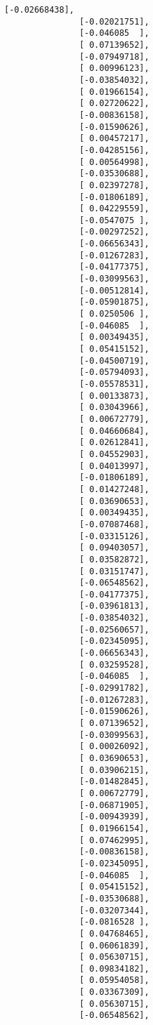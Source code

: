 \documentclass[11pt]{article}
\begin{document}
\begin{Verbatim}[commandchars=\\\{\}]
               [-0.02668438],
               [-0.02021751],
               [-0.046085  ],
               [ 0.07139652],
               [-0.07949718],
               [ 0.00996123],
               [-0.03854032],
               [ 0.01966154],
               [ 0.02720622],
               [-0.00836158],
               [-0.01590626],
               [ 0.00457217],
               [-0.04285156],
               [ 0.00564998],
               [-0.03530688],
               [ 0.02397278],
               [-0.01806189],
               [ 0.04229559],
               [-0.0547075 ],
               [-0.00297252],
               [-0.06656343],
               [-0.01267283],
               [-0.04177375],
               [-0.03099563],
               [-0.00512814],
               [-0.05901875],
               [ 0.0250506 ],
               [-0.046085  ],
               [ 0.00349435],
               [ 0.05415152],
               [-0.04500719],
               [-0.05794093],
               [-0.05578531],
               [ 0.00133873],
               [ 0.03043966],
               [ 0.00672779],
               [ 0.04660684],
               [ 0.02612841],
               [ 0.04552903],
               [ 0.04013997],
               [-0.01806189],
               [ 0.01427248],
               [ 0.03690653],
               [ 0.00349435],
               [-0.07087468],
               [-0.03315126],
               [ 0.09403057],
               [ 0.03582872],
               [ 0.03151747],
               [-0.06548562],
               [-0.04177375],
               [-0.03961813],
               [-0.03854032],
               [-0.02560657],
               [-0.02345095],
               [-0.06656343],
               [ 0.03259528],
               [-0.046085  ],
               [-0.02991782],
               [-0.01267283],
               [-0.01590626],
               [ 0.07139652],
               [-0.03099563],
               [ 0.00026092],
               [ 0.03690653],
               [ 0.03906215],
               [-0.01482845],
               [ 0.00672779],
               [-0.06871905],
               [-0.00943939],
               [ 0.01966154],
               [ 0.07462995],
               [-0.00836158],
               [-0.02345095],
               [-0.046085  ],
               [ 0.05415152],
               [-0.03530688],
               [-0.03207344],
               [-0.0816528 ],
               [ 0.04768465],
               [ 0.06061839],
               [ 0.05630715],
               [ 0.09834182],
               [ 0.05954058],
               [ 0.03367309],
               [ 0.05630715],
               [-0.06548562],

\end{Verbatim}
\end{document}
